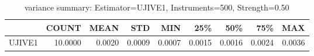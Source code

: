 \begin{table}[ht]
\centering
\caption{variance summary: Estimator=UJIVE1, Instruments=500, Strength=0.50}
\begin{tabular}{lrrrrrrrr}
\toprule
 & COUNT & MEAN & STD & MIN & 25\% & 50\% & 75\% & MAX \\
\midrule
UJIVE1 & 10.0000 & 0.0020 & 0.0009 & 0.0007 & 0.0015 & 0.0016 & 0.0024 & 0.0036 \\
\bottomrule
\end{tabular}
\end{table}
